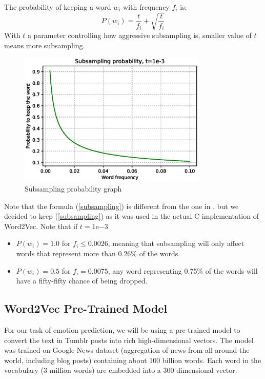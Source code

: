 The probability of keeping a word $w_i$ with frequency $f_i$ is:
\begin{equation}
    P(w_i) = \frac{t}{f_i} + \sqrt{\frac{t}{f_i}}
    \label{subsampling}
\end{equation}
With $t$ a parameter controlling how aggressive subsampling is, smaller value of $t$ means more subsampling. 

\begin{figure}[H]
    \centering
    \includegraphics[width=0.8\textwidth]{Images/subsampling_prob.eps}
    \caption{Subsampling probability graph}
\end{figure}

Note that the formula (\ref{subsampling}) is different from the one in \cite{word2vec2}, but we decided to keep (\ref{subsampling}) as it was used in the actual C implementation of Word2Vec. Note that if $t=1\mathrm{e}{-3}$
\begin{itemize}
    \item $P(w_i) = 1.0$ for $f_i\leq0.0026$, meaning that subsampling will only affect words that represent more than 0.26\% of the words.
    \item $P(w_i) = 0.5$ for $f_i=0.0075$, any word representing 0.75\% of the words will have a fifty-fifty chance of being dropped.
\end{itemize}

\subsection{Word2Vec Pre-Trained Model}

For our task of emotion prediction, we will be using a pre-trained model to convert the text in Tumblr posts into rich high-dimensional vectors. The model was trained on Google News dataset (aggregation of news from all around the world, including blog posts) containing about 100 billion words. Each word in the vocabulary (3 million words) are embedded into a 300 dimensional vector. 


